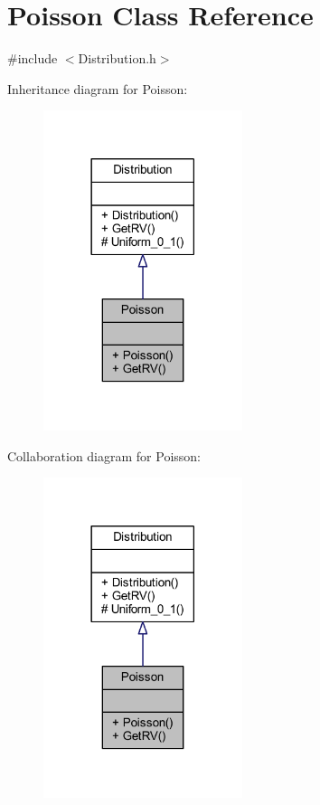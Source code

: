 \hypertarget{class_poisson}{}\section{Poisson Class Reference}
\label{class_poisson}


{\ttfamily \#include $<$Distribution.\+h$>$}



Inheritance diagram for Poisson\+:\nopagebreak
\begin{figure}[H]
\begin{center}
\leavevmode
\includegraphics[width=165pt]{class_poisson__inherit__graph}
\end{center}
\end{figure}


Collaboration diagram for Poisson\+:\nopagebreak
\begin{figure}[H]
\begin{center}
\leavevmode
\includegraphics[width=165pt]{class_poisson__coll__graph}
\end{center}
\end{figure}

